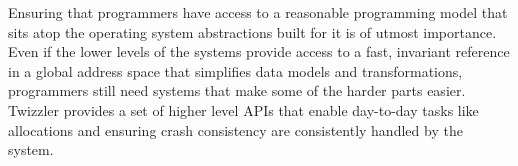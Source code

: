 \begin{chconc}
    Ensuring that programmers have access to a reasonable programming model that sits atop the operating system
    abstractions built for it is of utmost importance. Even if the lower levels of the systems provide access to a fast,
    invariant reference in a global address space that simplifies data models and transformations, programmers still
    need systems that make some of the harder parts easier. Twizzler provides a set of higher level APIs that enable
    day-to-day tasks like allocations and ensuring crash consistency are consistently handled by the system.
\end{chconc}


